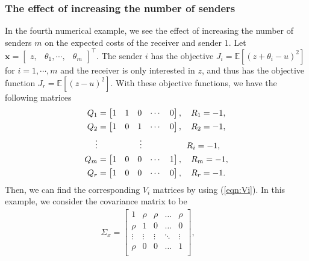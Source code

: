 \documentclass[12pt,journal,onecolumn]{IEEEtran}
\newcommand{\rknote}[1]{\noindent{\leavevmode\color{red}[Raj -- #1]}}
\begin{document}
\subsubsection{The effect of increasing the number of senders} In the fourth numerical example, we see the effect of increasing the number of senders $m$ on the expected costs of the receiver and sender $1$. Let $\boldsymbol{x}=\begin{bmatrix}{z}, & {\theta_1},\cdots, &{\theta_m}\end{bmatrix}^\top$. The sender $i$ has the objective $J_{i}=\mathbb{E}[({z}+{\theta_i}-{u})^2]$ for $i=1,\cdots, m$ and the receiver is only interested in ${z}$, and thus has the objective function  $J_{r} = \mathbb{E}[({z}-{u})^2]$. With these objective functions, we have the following matrices %
\begin{align*}
    Q_1&=\begin{bmatrix}1 &1 &0&\cdots&0\end{bmatrix},\quad R_1=-1,\\ Q_2&=\begin{bmatrix}1 &0 &1&\cdots&0\end{bmatrix},\quad R_2=-1,\\
    \vdots &\qquad \qquad\quad\vdots \qquad\qquad \quad \hspace{1mm} R_i=-1, \\
    Q_m&=\begin{bmatrix}1 &0 &0&\cdots&1\end{bmatrix},\quad R_m=-1,\\Q_r&=\begin{bmatrix}1 &0&0&\cdots &0\end{bmatrix},\quad R_r=-1.
\end{align*}
Then, we can find the corresponding $V_i$ matrices by using (\ref{eqn:Vi}). In this example, we consider the covariance matrix to be
\begin{align}\label{eqn:example_2}
\Sigma_x= \begin{bmatrix} 
    1 & \rho & \rho &\dots &\rho\\
    \rho & 1 & 0 &\dots &0\\
    \vdots & \vdots& \vdots&\ddots &\vdots \\
    \rho & 0 & 0 &\dots &1\\
    \end{bmatrix},
\qquad
\end{align}
\end{document}
